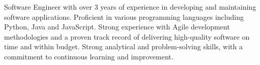 

\begin{cvparagraph}

Software Engineer with over 3 years of experience in developing and maintaining software applications. Proficient in various programming languages including Python, Java and JavaScript. Strong experience with Agile development methodologies and a proven track record of delivering high-quality software on time and within budget. Strong analytical and problem-solving skills, with a commitment to continuous learning and improvement.
\end{cvparagraph}